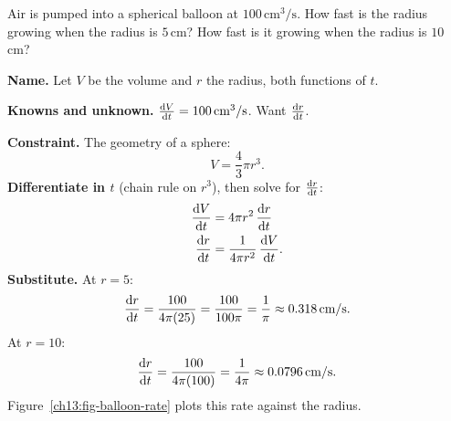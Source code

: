 \begin{example}
\label{ch13:ex-balloon}
Air is pumped into a spherical balloon at $100\,\text{cm}^3/\text{s}$. How fast is the radius growing when the
radius is $5$\,cm? How fast is it growing when the radius is $10$\,cm?

\textbf{Name.} Let $V$ be the volume and $r$ the radius, both functions of $t$.

\textbf{Knowns and unknown.} $\frac{\mathrm{d} V}{\mathrm{d} t} = 100\,\text{cm}^3/\text{s}$. Want $\frac{\mathrm{d} r}{\mathrm{d} t}$.

\textbf{Constraint.} The geometry of a sphere:
\[
V = \frac{4}{3}\pi r^3.
\]
\textbf{Differentiate in $t$} (chain rule on $r^3$), then solve for $\frac{\mathrm{d} r}{\mathrm{d} t}$:
\begin{align*}
\frac{\mathrm{d} V}{\mathrm{d} t} &= 4\pi r^2\,\frac{\mathrm{d} r}{\mathrm{d} t} \\
\frac{\mathrm{d} r}{\mathrm{d} t} &= \frac{1}{4\pi r^2}\,\frac{\mathrm{d} V}{\mathrm{d} t}.
\end{align*}
\textbf{Substitute.} At $r=5$:
\[
\frac{\mathrm{d} r}{\mathrm{d} t} = \frac{100}{4\pi(25)} = \frac{100}{100\pi} = \frac{1}{\pi}\approx 0.318\,\text{cm/s}.
\]
At $r=10$:
\[
\frac{\mathrm{d} r}{\mathrm{d} t} = \frac{100}{4\pi(100)} = \frac{1}{4\pi}\approx 0.0796\,\text{cm/s}.
\]
Figure~\ref{ch13:fig-balloon-rate} plots this rate against the radius.
\end{example}

